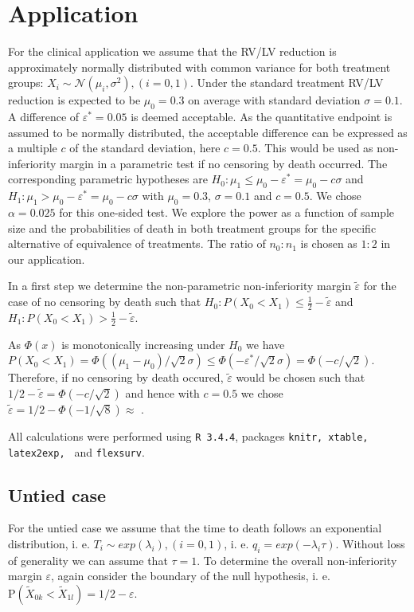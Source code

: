 \documentclass[bimj,fleqn]{w-art}
\theoremstyle{plain}
\theoremstyle{definition}
\begin{document}
\section{Application}
\label{sec:Application}
For the clinical application we assume that the RV/LV reduction is approximately normally distributed
with common variance for both treatment groups:
$X_i \sim \mathcal{N} ( \mu_i, \sigma^2 ), (i = 0, 1)$. Under the standard
treatment RV/LV reduction is expected to be $\mu_0 = 0.3$ on average with
standard deviation $\sigma= 0.1$. A difference of $\varepsilon^{*} = 0.05$ is
deemed acceptable. As the quantitative endpoint is assumed to be normally distributed,
the acceptable difference can be expressed as a multiple $c$
of the standard deviation, here $c = 0.5$. This would be used as
non-inferiority margin in a parametric test if no censoring by death occurred.
The corresponding parametric hypotheses are $H_0:
\mu_1 \leq \mu_0 - \varepsilon^{*}  = \mu_0 - c \sigma $ and
$H_1: \mu_1 > \mu_0 - \varepsilon^{*} = \mu_0 - c \sigma $ with $\mu_0 = 0.3$,
$\sigma = 0.1$ and $c = 0.5$. We chose $\alpha = 0.025$ for this one-sided test.
We explore the power as a function of sample size and the probabilities of death in
both treatment groups for the specific alternative of equivalence of treatments.
The ratio of $n_0 : n_1$ is chosen as $1 : 2 $ in our application.

In a first step we determine the non-parametric non-inferiority margin $\tilde{\varepsilon}$
for the case of no censoring by death such that
$H_0: P(X_0 < X_1) \leq \frac{1}{2} - \tilde{\varepsilon}$ and
$H_1: P(X_0 < X_1) >  \frac{1}{2} - \tilde{\varepsilon}$.

As $\Phi(x)$ is monotonically increasing under $H_0$ we have
$P(X_0 < X_1) = \Phi((\mu_1 - \mu_0)/\sqrt{2}\sigma) \leq
\Phi(- \varepsilon^{*}/ \sqrt{2}\sigma) = \Phi(-c/\sqrt{2}) $. Therefore, if no
censoring by death occured, $\tilde{\varepsilon}$ would be chosen such that
$1/2 - \tilde{\varepsilon} = \Phi(- c/\sqrt{2}) $ and hence with $c = 0.5$ we
chose  $\tilde{\varepsilon} = 1/2 - \Phi(- 1/\sqrt{8})
\approx $ .

All calculations were performed using {\tt{R 3.4.4}}, packages {\tt{knitr, xtable, latex2exp, }} and
{\tt{flexsurv}}.

\subsection{Untied case}
\label{sec:AppUntied}
For the untied case we assume that the time to death follows an exponential distribution, i. e.
$T_i \sim exp(\lambda_i), (i=0,1)$, i. e. $q_i = exp(-\lambda_i \tau)$. Without
loss of generality we can assume that $\tau = 1$. To determine the overall
non-inferiority margin $\varepsilon$, again consider the boundary of the null hypothesis,
i. e. $\text{P}(\widetilde{X}_{0k} < \widetilde{X}_{1l}) = 1/2 - \varepsilon $.
\end{document}

